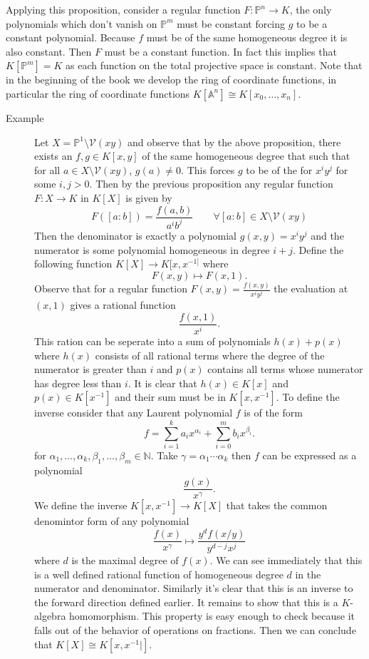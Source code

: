 \documentclass[40pt]{article}
\newcommand{\Proj}{\mathbb{P}}
\newcommand{\N}{\mathbb{N}}
\newcommand{\A}{\mathbb{A}}
\newcommand{\V}{\mathcal{V}}
\theoremstyle{remark}
\begin{document}
				Applying this proposition, consider a regular function $F : \Proj^n \to K$, the only polynomials which don't vanish on $\Proj^m$ must be constant forcing $g$ to be a constant polynomial. Because $f$ must be of the same homogeneous degree it is also constant. Then $F$ must be a constant function. In fact this implies that $K[\Proj^m] = K$ as each function on the total projective space is constant. Note that in the beginning of the book we develop the ring of coordinate functions, in particular the ring of coordinate functions $K[\A^n] \cong K[x_0,\dots,x_n]$. 
				\begin{description}
					\item[Example] Let $X = \Proj^1 \setminus \V(xy)$ and observe that by the above proposition, there exists an $f,g \in K[x,y]$ of the same homogeneous degree that such that for all $a \in X \setminus \V(xy)$, $g(a) \neq 0$. This forces $g$ to be of the for $x^iy^j$ for some $i,j > 0$. Then by the previous proposition any regular function $F : X \to K$ in $K[X]$ is given by 
					\[
					F([a:b]) = \frac{f(a,b)}{a^ib^j} \quad\quad \forall [a:b] \in X\setminus \V(xy)
					\]
					Then the denominator is exactly a polynomial $g(x,y) = x^iy^j$ and the numerator is some polynomial homogeneous in degree $i + j$. Define the following function $K[X] \to K[x,x^{-1]}$ where
					\[
					F(x,y) \mapsto F(x,1).
					\]
					Observe that for a regular function $F(x,y) = \frac{f(x,y)}{x^iy^j}$ the evaluation at $(x,1)$ gives a rational function 
					\[
					\frac{f(x,1)}{x^i}.
					\]
					This ration can be seperate into a sum of polynomials $h(x) + p(x)$ where $h(x)$ consists of all rational terms where the degree of the numerator is greater than $i$ and $p(x)$ contains all terms whose numerator has degree less than $i$. It is clear that $h(x) \in K[x]$ and $p(x) \in K[x^{-1}]$ and their sum must be in $K[x,x^{-1}]$. To define the inverse consider that any Laurent polynomial $f$ is of the form
					\[
					f = \sum_{i=1}^k a_ix^{\alpha_i} + \sum_{i=0}^mb_ix^{\beta_i}.
					\]
					for $\alpha_1,\dots,\alpha_k,\beta_1,\dots,\beta_m \in \N$. Take $\gamma = \alpha_1\cdots\alpha_k$ then $f$ can be expressed as a polynomial 
					\[
					\frac{g(x)}{x^\gamma}.
					\]
					We define the inverse $K[x,x^{-1}] \to K[X]$ that takes the common denomintor form of any polynomial 
					\[
					\frac{f(x)}{x^\gamma} \mapsto \frac{y^df(x/y)}{y^{d-j}x^j}
					\]
					where $d$ is the maximal degree of $f(x)$. We can see immediately that this is a well defined rational function of homogeneous degree $d$ in the numerator and denominator. Similarly it's clear that this is an inverse to the forward direction defined earlier. It remains to show that this is a $K$-algebra homomorphism. This property is easy enough to check because it falls out of the behavior of operations on fractions. Then we can conclude that $K[X] \cong K[x,x^{-1}|]$. 
				\end{description}
\end{document}
